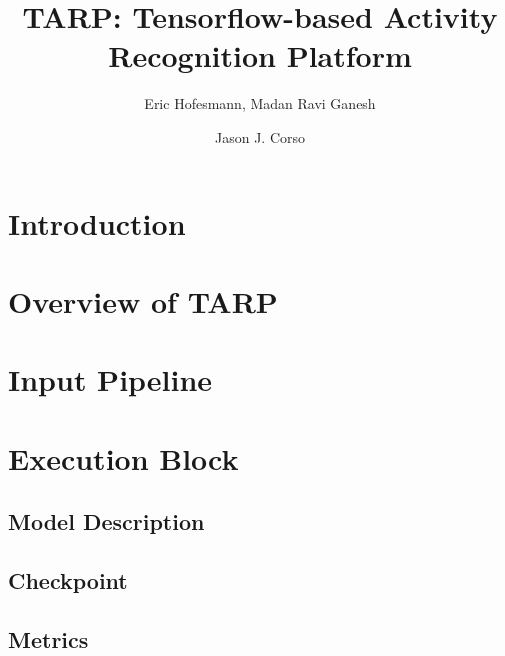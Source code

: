 \documentclass{llncs}
\begin{document}
\pagestyle{headings}
\mainmatter
\def\ECCV18SubNumber{1816}  %

\title{TARP: Tensorflow-based Activity Recognition Platform} %



\author{Eric Hofesmann, Madan Ravi Ganesh \and Jason J. Corso}
\newcommand{\acro}{TARP}

\maketitle

\begin{abstract}
\keywords{}
\end{abstract}

\section{Introduction}
\label{sec:intro}

\section{Overview of \acro}
\label{sec:overview}

\section{Input Pipeline}
\label{sec:ippipeline}

\section{Execution Block}
\label{sec:execblock}

\subsection{Model Description}
\label{sec:modeldesc}

\subsection{Checkpoint}
\label{sec:checkpoint}

\subsection{Metrics}
\label{sec:metrics}

\clearpage



\end{document}
